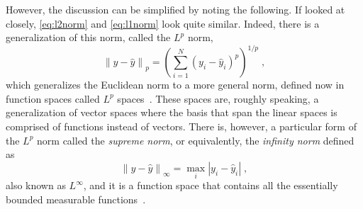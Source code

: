However, the discussion can be simplified by noting the following. If looked at closely,
\autoref{eq:l2norm} and \autoref{eq:l1norm} look quite similar. Indeed, there is a generalization of this norm, called the $L^p$ norm,
\begin{equation}
    { \left\lVert y - \hat{y} \right\rVert }_{p} = { \left( \sum_{i=1}^{N} { \left(y_i - \hat{y}_i \right) }^{p} \right) }^{1/p}
    \; ,
    \label{eq:lp-norm}
\end{equation}
which generalizes the Euclidean norm to a more general norm, defined now in function spaces 
called $L^p$ spaces~\cite{rudinPrinciplesMathematicalAnalysis2013}. These spaces are, 
roughly speaking, a generalization of vector spaces where the basis that span the linear 
spaces is comprised of functions instead of vectors. There is, however, a particular form of the $L^p$ norm called the \emph{supreme norm}, or equivalently, the \emph{infinity norm} defined as
\begin{equation}
    { \left\lVert y - \hat{y} \right\rVert }_{\infty} = 
    \underset{i}{\max}{\left\lvert y_i - \hat{y}_{i} \right\rvert}
    \; ,
    \label{eq:linf-norm}
\end{equation}
also known as \(L^{\infty}\), and it is a function space that contains all the essentially bounded measurable functions~\cite{taoIntroductionMeasureTheory2011}.

